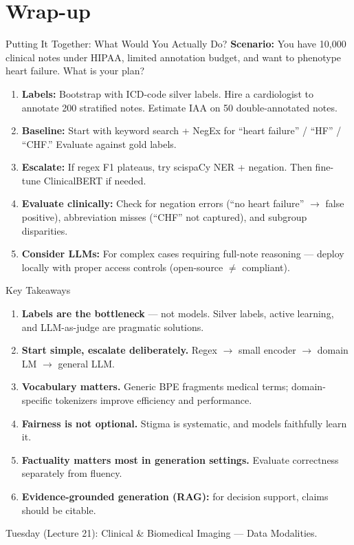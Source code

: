 \documentclass[aspectratio=169,11pt]{beamer}
\begin{document}
\section{Wrap-up}

\begin{frame}{Putting It Together: What Would You Actually Do?}
\textbf{Scenario:} You have 10,000 clinical notes under HIPAA, limited annotation budget, and want to phenotype heart failure. What is your plan?

\vspace{0.3em}
\small
\begin{enumerate}\setlength\itemsep{0.05em}
  \item \textbf{Labels:} Bootstrap with ICD-code silver labels. Hire a cardiologist to annotate 200 stratified notes. Estimate IAA on 50 double-annotated notes.
  \item \textbf{Baseline:} Start with keyword search + NegEx for ``heart failure'' / ``HF'' / ``CHF.'' Evaluate against gold labels.
  \item \textbf{Escalate:} If regex F1 plateaus, try scispaCy NER + negation. Then fine-tune ClinicalBERT if needed.
  \item \textbf{Evaluate clinically:} Check for negation errors (``no heart failure'' $\rightarrow$ false positive), abbreviation misses (``CHF'' not captured), and subgroup disparities.
  \item \textbf{Consider LLMs:} For complex cases requiring full-note reasoning --- deploy locally with proper access controls (open-source $\neq$ compliant).
\end{enumerate}
\end{frame}

\begin{frame}{Key Takeaways}
\small
\begin{enumerate}\setlength\itemsep{0.08em}
  \item \textbf{Labels are the bottleneck} --- not models. Silver labels, active learning, and LLM-as-judge are pragmatic solutions.
  \item \textbf{Start simple, escalate deliberately.} Regex $\rightarrow$ small encoder $\rightarrow$ domain LM $\rightarrow$ general LLM.
  \item \textbf{Vocabulary matters.} Generic BPE fragments medical terms; domain-specific tokenizers improve efficiency and performance.
  \item \textbf{Fairness is not optional.} Stigma is systematic, and models faithfully learn it.
  \item \textbf{Factuality matters most in generation settings.} Evaluate correctness separately from fluency.
  \item \textbf{Evidence-grounded generation (RAG):} for decision support, claims should be citable.
\end{enumerate}

\vspace{0.2em}
\alert{Tuesday (Lecture 21):} Clinical \& Biomedical Imaging --- Data Modalities.
\end{frame}
\end{document}
